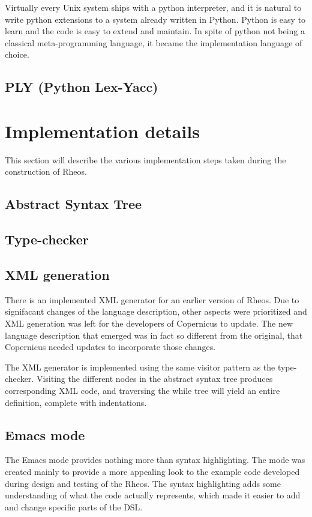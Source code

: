 Virtually every Unix system ships with a python interpreter, and it is
natural to write python extensions to a system already written in
Python. Python is easy to learn and the code is easy to extend and
maintain. In spite of python not being a classical meta-programming
language, it became the implementation language of choice.


\subsection{PLY (Python Lex-Yacc)}\label{sec:ply}



\section{Implementation details}
This section will describe the various implementation steps taken
during the construction of Rheos.


\subsection{Abstract Syntax Tree}\label{sec:ast}



\subsection{Type-checker}\label{sec:typechecker}



\subsection{XML generation}\label{sec:xml}
There is an implemented XML generator for an earlier version of
Rheos. Due to signifacant changes of the language description, other
aspects were prioritized and XML generation was left for the
developers of Copernicus to update. The new language description that
emerged was in fact so different from the original, that Copernicus
needed updates to incorporate those changes.

The XML generator is implemented using the same visitor pattern as the
type-checker. Visiting the different nodes in the abstract syntax tree
produces corresponding XML code, and traversing the while tree will
yield an entire definition, complete with indentations.


\subsection{Emacs mode}\label{sec:emacs}
The Emacs mode provides nothing more than syntax highlighting. The
mode was created mainly to provide a more appealing look to the
example code developed during design and testing of the Rheos. The
syntax highlighting adds some understanding of what the code actually
represents, which made it easier to add and change specific parts of
the DSL.


